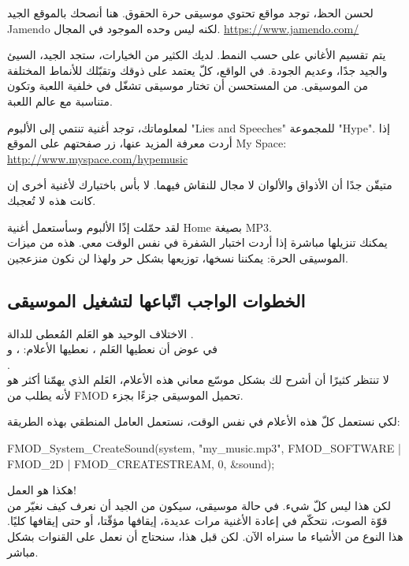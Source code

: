 لحسن الحظ، توجد مواقع تحتوي موسيقى حرة الحقوق. هنا أنصحك بالموقع الجيد
\textenglish{Jamendo}
لكنه ليس وحده الموجود في المجال.
\url{https://www.jamendo.com/}

يتم تقسيم الأغاني على حسب النمط. لديك الكثير من الخيارات، ستجد الجيد، السيئ والجيد جدًا، وعديم الجودة. في الواقع، كلّ يعتمد على ذوقك وتقبّلك للأنماط المختلفة من الموسيقى. من المستحسن أن تختار موسيقى تشغّل في خلفية اللعبة وتكون متناسبة مع عالم اللعبة.

لمعلوماتك، توجد أغنية تنتمي إلى الألبوم
"\textenglish{Lies and Speeches}"
للمجموعة
"\textenglish{Hype}".
إذا أردت معرفة المزيد عنها، زر صفحتهم على الموقع
\textenglish{My Space}:
\url{http://www.myspace.com/hypemusic}

\begin{information}
متيقّن جدًا أن الأذواق والألوان لا مجال للنقاش فيهما. لا بأس باختيارك لأغنية أخرى إن كانت هذه لا تُعجبك.
\end{information}

لقد حمّلت إذًا الألبوم وسأستعمل أغنية
\textenglish{Home}
بصيغة
\textenglish{MP3}.\\
يمكنك تنزيلها مباشرة إذا أردت اختبار الشفرة في نفس الوقت معي. هذه من ميزات الموسيقى الحرة: يمكننا نسخها، توزيعها بشكل حر ولهذا لن نكون منزعجين.

\subsection{الخطوات الواجب اتّباعها لتشغيل الموسيقى}

الاختلاف الوحيد هو العَلم المُعطى للدالة
.\\
في عوض أن نعطيها العَلم
،
نعطيها الأعلام:
،  و\\
.\\
لا تنتظر كثيرًا أن أشرح لك بشكل موسّع معاني هذه الأعلام، العَلم الذي يهمّنا أكثر هو
لأنه يطلب من
\textenglish{FMOD}
تحميل الموسيقى جزءًا بجزء.

لكي نستعمل كلّ هذه الأعلام في نفس الوقت، نستعمل العامل المنطقي
\InlineCode{|}
بهذه الطريقة:

\begin{Csource}
FMOD_System_CreateSound(system, "my_music.mp3", FMOD_SOFTWARE | FMOD_2D | FMOD_CREATESTREAM, 0, &sound);
\end{Csource}

هكذا هو العمل!\\
لكن هذا ليس كلّ شيء. في حالة موسيقى، سيكون من الجيد أن نعرف كيف نغيّر من قوّة الصوت، نتحكّم في إعادة الأغنية مرات عديدة، إيقافها مؤقّتا، أو حتى إيقافها كليًا. هذا النوع من الأشياء ما سنراه الآن. لكن قبل هذا، سنحتاج أن نعمل على القنوات بشكل مباشر.

